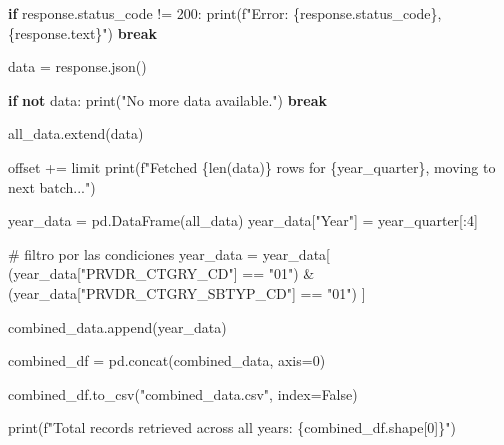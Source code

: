 \documentclass[
  letterpaper,
  DIV=11,
  numbers=noendperiod]{scrartcl}
\newenvironment{Shaded}{\begin{snugshade}}{\end{snugshade}}
\newcommand{\BuiltInTok}[1]{\textcolor[rgb]{0.00,0.23,0.31}{#1}}
\newcommand{\CommentTok}[1]{\textcolor[rgb]{0.37,0.37,0.37}{#1}}
\newcommand{\ControlFlowTok}[1]{\textcolor[rgb]{0.00,0.23,0.31}{\textbf{#1}}}
\newcommand{\DecValTok}[1]{\textcolor[rgb]{0.68,0.00,0.00}{#1}}
\newcommand{\KeywordTok}[1]{\textcolor[rgb]{0.00,0.23,0.31}{\textbf{#1}}}
\newcommand{\NormalTok}[1]{\textcolor[rgb]{0.00,0.23,0.31}{#1}}
\newcommand{\OperatorTok}[1]{\textcolor[rgb]{0.37,0.37,0.37}{#1}}
\newcommand{\SpecialCharTok}[1]{\textcolor[rgb]{0.37,0.37,0.37}{#1}}
\newcommand{\SpecialStringTok}[1]{\textcolor[rgb]{0.13,0.47,0.30}{#1}}
\newcommand{\StringTok}[1]{\textcolor[rgb]{0.13,0.47,0.30}{#1}}
\newcommand{\VariableTok}[1]{\textcolor[rgb]{0.07,0.07,0.07}{#1}}
\begin{document}
\begin{Shaded}
\begin{Highlighting}[]
        \ControlFlowTok{if}\NormalTok{ response.status\_code }\OperatorTok{!=} \DecValTok{200}\NormalTok{:}
            \BuiltInTok{print}\NormalTok{(}\SpecialStringTok{f"Error: }\SpecialCharTok{\{}\NormalTok{response}\SpecialCharTok{.}\NormalTok{status\_code}\SpecialCharTok{\}}\SpecialStringTok{, }\SpecialCharTok{\{}\NormalTok{response}\SpecialCharTok{.}\NormalTok{text}\SpecialCharTok{\}}\SpecialStringTok{"}\NormalTok{)}
            \ControlFlowTok{break}

\NormalTok{        data }\OperatorTok{=}\NormalTok{ response.json()}

        \ControlFlowTok{if} \KeywordTok{not}\NormalTok{ data:}
            \BuiltInTok{print}\NormalTok{(}\StringTok{"No more data available."}\NormalTok{)}
            \ControlFlowTok{break}

\NormalTok{        all\_data.extend(data)}

\NormalTok{        offset }\OperatorTok{+=}\NormalTok{ limit}
        \BuiltInTok{print}\NormalTok{(}\SpecialStringTok{f"Fetched }\SpecialCharTok{\{}\BuiltInTok{len}\NormalTok{(data)}\SpecialCharTok{\}}\SpecialStringTok{ rows for }\SpecialCharTok{\{}\NormalTok{year\_quarter}\SpecialCharTok{\}}\SpecialStringTok{, moving to next batch..."}\NormalTok{)}

\NormalTok{    year\_data }\OperatorTok{=}\NormalTok{ pd.DataFrame(all\_data)}
\NormalTok{    year\_data[}\StringTok{"Year"}\NormalTok{] }\OperatorTok{=}\NormalTok{ year\_quarter[:}\DecValTok{4}\NormalTok{]}

    \CommentTok{\# filtro por las condiciones}
\NormalTok{    year\_data }\OperatorTok{=}\NormalTok{ year\_data[}
\NormalTok{    (year\_data[}\StringTok{"PRVDR\_CTGRY\_CD"}\NormalTok{] }\OperatorTok{==} \StringTok{"01"}\NormalTok{) }\OperatorTok{\&} 
\NormalTok{    (year\_data[}\StringTok{"PRVDR\_CTGRY\_SBTYP\_CD"}\NormalTok{] }\OperatorTok{==} \StringTok{"01"}\NormalTok{)}
\NormalTok{]  }

\NormalTok{    combined\_data.append(year\_data)}

\NormalTok{combined\_df }\OperatorTok{=}\NormalTok{ pd.concat(combined\_data, axis}\OperatorTok{=}\DecValTok{0}\NormalTok{)}

\NormalTok{combined\_df.to\_csv(}\StringTok{"combined\_data.csv"}\NormalTok{, index}\OperatorTok{=}\VariableTok{False}\NormalTok{)}

\BuiltInTok{print}\NormalTok{(}\SpecialStringTok{f"Total records retrieved across all years: }\SpecialCharTok{\{}\NormalTok{combined\_df}\SpecialCharTok{.}\NormalTok{shape[}\DecValTok{0}\NormalTok{]}\SpecialCharTok{\}}\SpecialStringTok{"}\NormalTok{)}
\end{Highlighting}
\end{Shaded}
\end{document}
